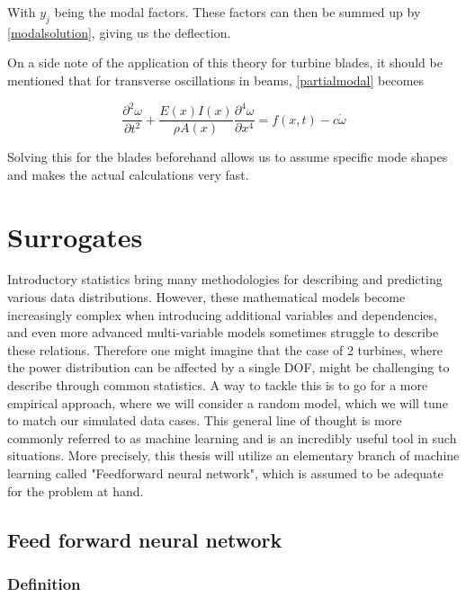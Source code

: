 With $y_j$ being the modal factors. These factors can then be summed up by \ref{modalsolution}, giving us the deflection.

On a side note of the application of this theory for turbine blades, it should be mentioned that for transverse oscillations in beams, \ref{partialmodal} becomes

\begin{equation}
\frac{\partial^2 \omega}{\partial t^2} + \frac{E(x) I(x)}{\rho A(x)} \frac{\partial^4 \omega }{\partial x^4} = f(x, t)-c \dot{\omega}
\end{equation}

Solving this for the blades beforehand allows us to assume specific mode shapes and makes the actual calculations very fast. 

\section{Surrogates}

Introductory statistics bring many methodologies for describing and predicting various data distributions. However, these mathematical models become increasingly complex when introducing additional variables and dependencies, and even more advanced multi-variable models sometimes struggle to describe these relations. Therefore one might imagine that the case of 2 turbines, where the power distribution can be affected by a single DOF, might be challenging to describe through common statistics. A way to tackle this is to go for a more empirical approach, where we will consider a random model, which we will tune to match our simulated data cases. This general line of thought is more commonly referred to as machine learning \cite{3blue1brown} and is an incredibly useful tool in such situations. More precisely, this thesis will utilize an elementary branch of machine learning called "Feedforward neural network", which is assumed to be adequate for the problem at hand.

\subsection{Feed forward neural network}

\subsubsection*{Definition}

